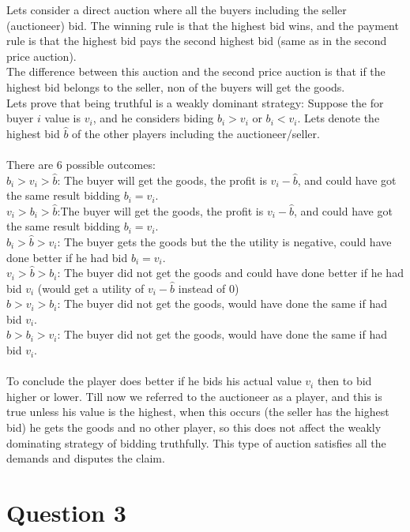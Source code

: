 \documentclass{article}
\begin{document}
Lets consider a direct auction where all the buyers including  the seller
(auctioneer) bid.  The winning rule is that the highest bid wins, and the
payment rule is that the highest bid pays the second highest bid (same as in the second price
auction). 
\\
The difference between this auction and the second price auction is
that if the highest bid belongs to the seller, non of the buyers will get the
goods. 
\\
Lets prove that being truthful is a weakly dominant strategy:
Suppose the for buyer $i$ value is $v_i$,  and he considers biding $b_i>v_i$ or
$b_i<v_i$.
Lets denote the highest bid $\hat{b}$ of the other players including the
auctioneer/seller.
\\
\\
There are 6 possible outcomes:
\\
$b_i>v_i>\hat{b}$: The buyer will get the goods, the profit is $v_i-\hat{b}$, 
and could have got the same result bidding $b_i=v_i$.
\\
$v_i>b_i>\hat{b}$:The buyer will get the goods, the profit is $v_i-\hat{b}$,
and could have got the same result bidding $b_i=v_i$.
\\
$b_i>\hat{b}>v_i$: The buyer gets the goods but the the utility is negative,
could have done better if he had bid $b_i=v_i$.
\\
$v_i>\hat{b}>b_i$: The buyer did not get the goods and could have done better if
he had bid $v_i$ (would get a utility of $v_i-\hat{b}$ instead of 0)
\\
$\hat{b}>v_i>b_i$: The buyer did not get the goods, would  have done the same if
had bid $v_i$.
\\
$\hat{b}>b_i>v_i$: The buyer did not get the goods, would  have done the same if
had bid $v_i$.
\\
\\
To conclude the player does better if he bids his actual value $v_i$ then to bid
higher or lower. Till now we referred to the auctioneer as a player, and this is true unless his value is
the highest, when this occurs (the seller has the highest bid) he gets the goods
and no other player, so this does not affect the weakly dominating strategy of
bidding truthfully. This type of auction satisfies all the demands and disputes
the claim.

\section*{Question 3}
\end{document}
